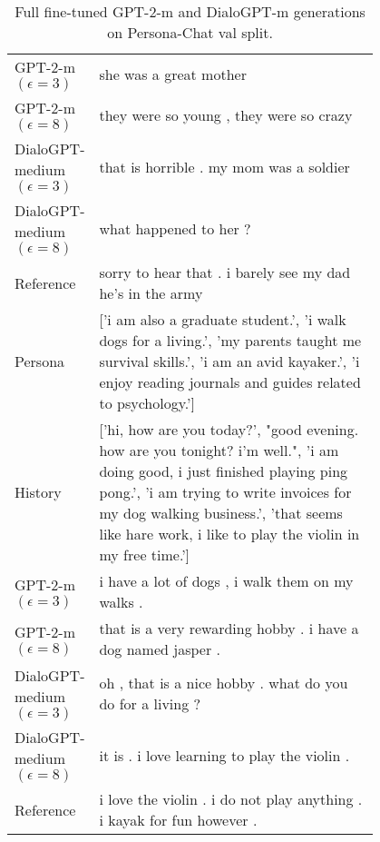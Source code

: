 \begin{table}[h]
\begin{tabular}{l | p{0.8\linewidth}}
 \hline
GPT-2-m $(\epsilon=3)$ & she was a great mother \\
GPT-2-m $(\epsilon=8)$ & they were so young , they were so crazy \\
DialoGPT-medium $(\epsilon=3)$ & that is horrible . my mom was a soldier \\
DialoGPT-medium $(\epsilon=8)$ & what happened to her ? \\
\hline
 Reference & sorry to hear that . i barely see my dad he's in the army \\
\midrule\midrule
Persona & ['i am also a graduate student.', 'i walk dogs for a living.', 'my parents taught me survival skills.', 'i am an avid kayaker.', 'i enjoy reading journals and guides related to psychology.'] \\
 \hline
History & ['hi, how are you today?', "good evening. how are you tonight? i'm well.", 'i am doing good, i just finished playing ping pong.', 'i am trying to write invoices for my dog walking business.', 'that seems like hare work, i like to play the violin in my free time.'] \\
 \hline
GPT-2-m $(\epsilon=3)$ & i have a lot of dogs , i walk them on my walks . \\
GPT-2-m $(\epsilon=8)$ & that is a very rewarding hobby . i have a dog named jasper . \\
DialoGPT-medium $(\epsilon=3)$ & oh , that is a nice hobby . what do you do for a living ? \\
DialoGPT-medium $(\epsilon=8)$ & it is . i love learning to play the violin . \\
\hline
 Reference & i love the violin . i do not play anything . i kayak for fun however . \\
\bottomrule
\end{tabular}
\caption{\small Full fine-tuned GPT-2-m and DialoGPT-m generations on Persona-Chat val split.}
\end{table}
